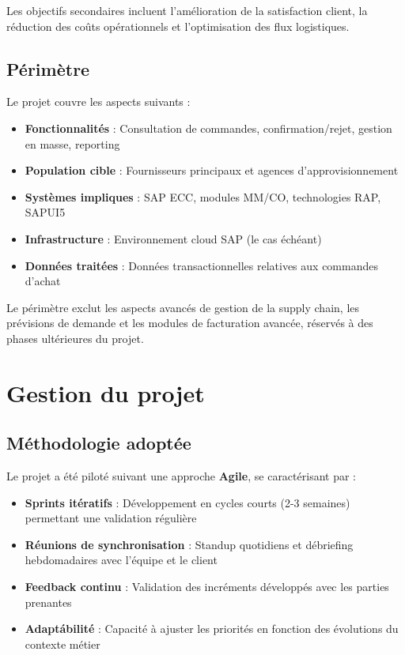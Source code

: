 \documentclass[12pt,a4paper,oneside]{report}
\begin{document}
Les objectifs secondaires incluent l'am\'elioration de la satisfaction client, la r\'eduction des coûts
op\'erationnels et l'optimisation des flux logistiques.

\subsection{P\'erim\`etre}\label{ch1:perimetre}

Le projet couvre les aspects suivants :

\begin{itemize}[label=---, itemsep=0.15em]
	\item \textbf{Fonctionnalit\'es} : Consultation de commandes, confirmation/rejet, gestion en masse, reporting
	\item \textbf{Population cible} : Fournisseurs principaux et agences d'approvisionnement
	\item \textbf{Syst\`emes impliques} : SAP ECC, modules MM/CO, technologies RAP, SAPUI5
	\item \textbf{Infrastructure} : Environnement cloud SAP (le cas \'ech\'eant)
	\item \textbf{Donn\'ees trait\'ees} : Donn\'ees transactionnelles relatives aux commandes d'achat
\end{itemize}

Le p\'erim\`etre exclut les aspects avanc\'es de gestion de la supply chain, les pr\'evisions de demande
et les modules de facturation avanc\'ee, r\'eserv\'es \`a des phases ult\'erieures du projet.

\section{Gestion du projet}\label{ch1:gestion}

\subsection{M\'ethodologie adopt\'ee}\label{ch1:methodologie}
Le projet a \'et\'e pilot\'e suivant une approche \textbf{Agile}, se caract\'erisant par :

\begin{itemize}[label=---, itemsep=0.15em]
	\item \textbf{Sprints it\'eratifs} : D\'eveloppement en cycles courts (2-3 semaines) permettant une validation r\'eguli\`ere
	\item \textbf{R\'eunions de synchronisation} : Standup quotidiens et d\'ebriefing hebdomadaires avec l'\'equipe et le client
	\item \textbf{Feedback continu} : Validation des incr\'ements d\'evelopp\'es avec les parties prenantes
	\item \textbf{Adapt\'abilit\'e} : Capacit\'e \`a ajuster les priorit\'es en fonction des \'evolutions du contexte m\'etier
\end{itemize}
\end{document}
